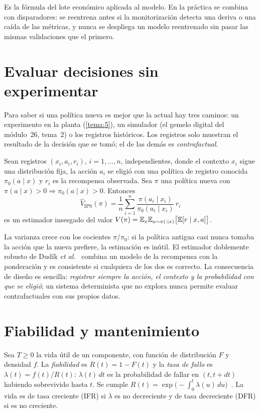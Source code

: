 Es la fórmula del lote económico aplicada al modelo. En la práctica se combina con disparadores: se reentrena antes si la monitorización detecta una deriva o una caída de las métricas, y nunca se despliega un modelo reentrenado sin pasar las mismas validaciones que el primero.

\section{Evaluar decisiones sin experimentar}\label{sec:contrafactual}

Para saber si una política nueva es mejor que la actual hay tres caminos: un experimento en la planta (\cref{tema:5}), un simulador (el gemelo digital del módulo~26, tema~2) o los registros históricos. Los registros solo muestran el resultado de la decisión que se tomó; el de las demás es \emph{contrafactual}.

\begin{proposicion}\label{prop:ips}
Sean registros $(x_i,a_i,r_i)$, $i=1,\dots,n$, independientes, donde el contexto $x_i$ sigue una distribución fija, la acción $a_i$ se eligió con una política de registro conocida $\pi_0(a\mid x)$ y $r_i$ es la recompensa observada. Sea $\pi$ una política nueva con $\pi(a\mid x)>0\Rightarrow\pi_0(a\mid x)>0$. Entonces
\[
\hat V_{\mathrm{IPS}}(\pi)=\frac1n\sum_{i=1}^{n}\frac{\pi(a_i\mid x_i)}{\pi_0(a_i\mid x_i)}\,r_i
\]
es un estimador insesgado del valor $V(\pi)=\mathbb{E}_{x}\mathbb{E}_{a\sim\pi(\cdot\mid x)}\bigl[\mathbb{E}[r\mid x,a]\bigr]$.
\end{proposicion}

La varianza crece con los cocientes $\pi/\pi_0$: si la política antigua casi nunca tomaba la acción que la nueva prefiere, la estimación es inútil. El estimador doblemente robusto de Dudík \emph{et al.}~\cite{dudik} combina un modelo de la recompensa con la ponderación y es consistente si cualquiera de los dos es correcto. La consecuencia de diseño es sencilla: \emph{registrar siempre la acción, el contexto y la probabilidad con que se eligió}; un sistema determinista que no explora nunca permite evaluar contrafactuales con sus propios datos.

\section{Fiabilidad y mantenimiento}

\begin{definicion}\label{def:fiabilidad}
Sea $T\ge0$ la vida útil de un componente, con función de distribución $F$ y densidad $f$. La \emph{fiabilidad} es $R(t)=1-F(t)$ y la \emph{tasa de fallo} es $\lambda(t)=f(t)/R(t)$: $\lambda(t)\,dt$ es la probabilidad de fallar en $(t,t+dt)$ habiendo sobrevivido hasta $t$. Se cumple $R(t)=\exp\bigl(-\int_0^t\lambda(u)\,du\bigr)$~\cite{mit1010}. La vida es de tasa creciente (IFR) si $\lambda$ es no decreciente y de tasa decreciente (DFR) si es no creciente.
\end{definicion}

